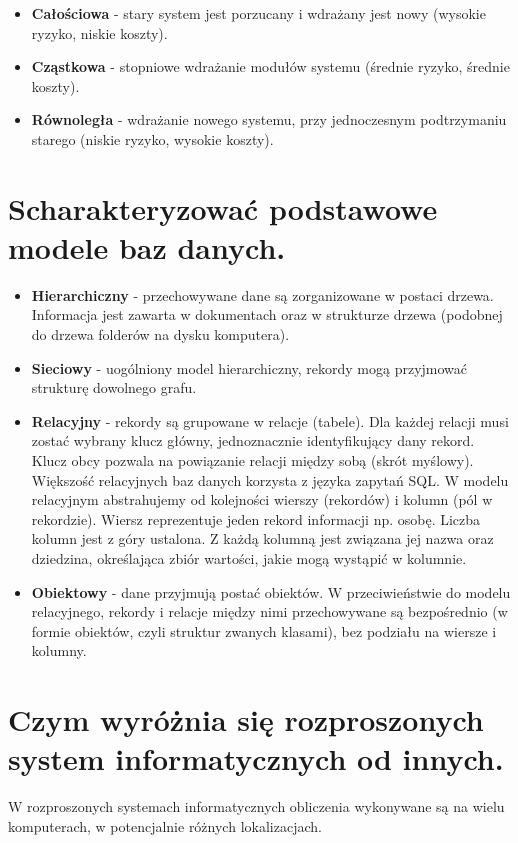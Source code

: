 \documentclass[12pt,a4paper]{article}
\begin{document}
	\begin{itemize}
		\item  \textbf{Całościowa} - stary system jest porzucany i wdrażany jest nowy (wysokie ryzyko, niskie koszty).
		\item \textbf{Cząstkowa} - stopniowe wdrażanie modułów systemu (średnie ryzyko, średnie koszty).
		\item \textbf{Równoległa} - wdrażanie nowego systemu, przy jednoczesnym podtrzymaniu starego (niskie ryzyko, wysokie koszty).	
	\end{itemize}

	\section{Scharakteryzować podstawowe modele baz danych.}
	\begin{itemize}
		\item  \textbf{Hierarchiczny} -  przechowywane dane są zorganizowane w postaci drzewa. Informacja jest zawarta w dokumentach oraz w strukturze drzewa (podobnej do drzewa folderów na dysku komputera).
		\item  \textbf{Sieciowy} - uogólniony model hierarchiczny, rekordy mogą przyjmować strukturę dowolnego grafu.
		\item  \textbf{Relacyjny} - rekordy są grupowane w relacje (tabele). Dla każdej relacji musi zostać wybrany klucz główny, jednoznacznie identyfikujący dany rekord. Klucz obcy pozwala na powiązanie relacji między sobą (skrót myślowy). Większość relacyjnych baz danych korzysta z języka zapytań SQL. W modelu relacyjnym abstrahujemy od kolejności wierszy (rekordów) i kolumn (pól w rekordzie). Wiersz reprezentuje jeden rekord informacji np. osobę. Liczba kolumn jest z góry ustalona. Z każdą kolumną jest związana jej nazwa oraz dziedzina, określająca zbiór wartości, jakie mogą wystąpić w kolumnie.
		\item  \textbf{Obiektowy} - dane przyjmują postać obiektów. W przeciwieństwie do modelu relacyjnego, rekordy i relacje między nimi przechowywane są bezpośrednio (w formie obiektów, czyli struktur zwanych klasami), bez podziału na wiersze i kolumny.
	\end{itemize}

	\section{Czym wyróżnia się rozproszonych system informatycznych od innych.}
	W rozproszonych systemach informatycznych obliczenia wykonywane są na wielu komputerach, w potencjalnie różnych lokalizacjach.
\end{document}
